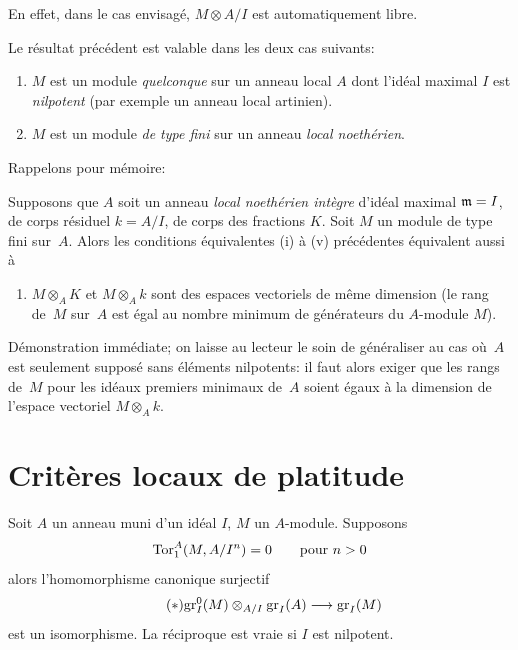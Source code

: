 En effet, dans le cas envisag\'e, $M \otimes A/I$ est
automatiquement libre.

Le r\'esultat pr\'ec\'edent est valable dans les deux cas
suivants:
\begin{enumerate}
\item[(a)] $M$ est un module \emph{quelconque} sur un anneau local $A$
dont l'id\'eal maximal $I$ est \emph{nilpotent} (par exemple un
anneau local artinien).
\item[(b)] $M$ est un module \emph{de type fini} sur un anneau
\emph{local noethérien}.
\end{enumerate}

Rappelons
pour m\'emoire:
\begin{corollaire}
\label{IV.4.4}
Supposons que $A$ soit un anneau \emph{local noethérien
intègre} d'id\'eal maximal $\mathfrak{m} = I$, de corps r\'esiduel
$k = A/I$, de corps des fractions $K$. Soit $M$ un module de type fini
sur~$A$. Alors les conditions \'equivalentes \textup{(i)} \`a \textup{(v)}
pr\'ec\'edentes \'equivalent aussi \`a
\enlargethispage{.5cm}\begin{enumerate}
\item[(vi)] $M \otimes_A K$ et $M \otimes_A k$ sont des espaces
vectoriels de m\^eme dimension (\ie le rang de~$M$ sur~$A$ est
\'egal au nombre minimum de g\'en\'erateurs du $A$-module $M$).
\end{enumerate}
\end{corollaire}

D\'emonstration imm\'ediate; on laisse au lecteur le soin de
g\'en\'eraliser au cas o\`u~$A$ est seulement suppos\'e sans
\'el\'ements nilpotents: il faut alors exiger que les rangs de~$M$
pour les id\'eaux premiers minimaux de~$A$ soient \'egaux \`a la
dimension de l'espace vectoriel $M \otimes_A k$.

\section{Crit\`eres locaux de platitude}
\label{IV.5}

\begin{proposition}
\label{IV.5.1}
Soit $A$ un anneau muni d'un id\'eal $I$, $M$ un
$A$-module. Supposons
$$
\operatorname{Tor}_1^A(M, A/I^n) = 0 \qquad \text{pour $n>0$}
$$
alors l'homomorphisme canonique surjectif
\begin{equation*}
\label{eq:IV.5.1.*}
\tag{$*$} {\gr_I^0(M) \otimes_{A/I} \gr_I(A) \to \gr_I(M)}
\end{equation*}
est un isomorphisme. La r\'eciproque est vraie si $I$ est nilpotent.
\end{proposition}


